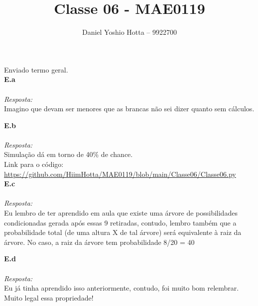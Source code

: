 \documentclass{article}
\begin{document}
	
	\title{Classe 06 - MAE0119}
	\author{Daniel Yoshio Hotta – 9922700}
	
	\maketitle	
	
	Enviado termo geral.\\
	
	\textbf {E.a} 
	\\ \\
	\textit {Resposta:} \\
    
    Imagino que devam ser menores que as brancas não sei dizer quanto sem cálculos.\\
    
    \maketitle	
    
    \textbf {E.b} 
    \\ \\
    \textit {Resposta:} \\
	
    Simulação dá em torno de 40\% de chance. \\
    
    Link para o código: \url{https://github.com/HiimHotta/MAE0119/blob/main/Classe06/Classe06.py}\\
    
    
    \textbf {E.c} 
    \\ \\
    \textit {Resposta:} \\
    
    Eu lembro de ter aprendido em aula que existe uma árvore de possibilidades condicionadas gerada após essas 9 retiradas, contudo, lembro também que a probabilidade total (de uma altura X de tal árvore) será equivalente à raiz da árvore. No caso, a raiz da árvore tem probabilidade 8/20 = 40%
    
    \textbf {E.d} 
    \\ \\
    \textit {Resposta:} \\
    
    Eu já tinha aprendido isso anteriormente, contudo, foi muito bom relembrar. Muito legal essa propriedade!
	
\end{document}
